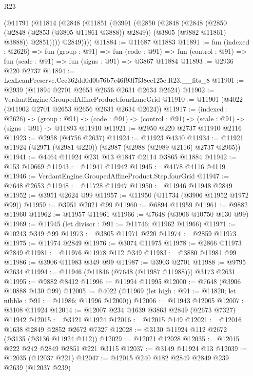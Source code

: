 \begin{lexlean}{R23}
\begin{coremodule}
      (@11791
        (@11814
          (@2848
            (@11851
              (@3991
                (@2850
                  (@2848
                    (@2848
                      (@2850 (@2848 (@2853 (@3805 @11861 @3888)) @2849))
                      (@3805 (@9882 @11861) @3888))
                    @2851))))
            @2849))))
@11884 := @11687 @11883
@11891 := fun (indexed : @2626) =>
  fun (group : @91) =>
  fun (code : @91) => fun (control : @91) => fun (scale : @91) => fun (signs : @91) => @3867 @11884
@11893 := @2936 @220 @2737
@11894 := LexLeanPreserve.Ccc362dd0d0b76b7c46f93f7f38ec125e.R23.__fits_8
@11901 := @2939 (@11894 @2701 @2653 @2656 @2631 @2634 @2624)
@11902 := VerdantEngine.GroupedAffineProduct.fourLaneGrid
@11910 := @11901 (@4022 (@11902 @2701 @2653 @2656 @2631 @2634 @2624))
@11917 := (indexed : @2626) ->
  (group : @91) ->
  (code : @91) -> (control : @91) -> (scale : @91) -> (signs : @91) -> @11893 @11910
@11921 := @2950 @220 @2737 @11910 @2116
@11923 := @2958 (@4756 @2637)
@11924 := @11923 @4340
@11934 := @11921 @11924 (@2971 (@2981 @220)) (@2987 (@2988 (@2989 @2116) @2737 @2965))
@11941 := @4464 @11924 @231 @13 @1847 @2114 @3865 @11884
@11942 := @153 @10669
@11943 := @11941 @11942
@11945 := @4178 @4116 @4119
@11946 := VerdantEngine.GroupedAffineProduct.Step.fourGrid
@11947 := @7648 @2653
@11948 := @11728 @11947
@11950 := @11946 @11948 @2849
@11952 := @3951 @2624 @99
@11957 := @11950 (@11734 (@3906 @11952 @1972 @99))
@11959 := @3951 @2021 @99
@11960 := @6894 @11959
@11961 := @9882 @11960
@11962 := @11957 @11961
@11966 := @7648 (@3906 @10750 @130 @99)
@11969 := @11945 (let divisor : @91 := @11746; @11962 @11966)
@11971 := @10243 @349 @99
@11973 := @3805 @11971 @220
@11974 := @2859 @11973
@11975 := @11974 @2849
@11976 := @3074 @11975
@11978 := @2866 @11973 @2849
@11981 := @11976 @11978 @112 @349
@11983 := @3880 @11981 @99
@11986 := @3906 @11983 @349 @99
@11987 := @3903 @2701
@11988 := @9795 @2634
@11994 := @11946 (@11846 (@7648 (@11987 @11988))) @3173 @2631
@11995 := @9882 @8412
@11996 := @11994 @11995
@12000 := @7648 (@3906 @10888 @130 @99)
@12005 := @4022 (@11969 (let high : @91 := @11820; let nibble : @91 := @11986; @11996 @12000))
@12006 := @11943 @12005
@12007 := @3108 @11924
@12014 := @12007 @234 @1639 @3863 @2849 (@2673 @7327) @11942
@12015 := @3121 @11924
@12016 := @12015 @149
@12021 := @12016 @1638 @2849 @2852 @2672 @7327
@12028 := @3130 @11924 @112 @2672 (@3135 (@3136 @11924 @112))
@12029 := @12021 @12028
@12035 := @12015 @222 @242 @2849 @2851 @221 @3115
@12037 := @3149 @11924 @13
@12039 := @12035 (@12037 @221)
@12047 := @12015 @240 @182 @2849 @2849 @239 @2639 (@12037 @239)

\end{coremodule}
\end{lexlean}
